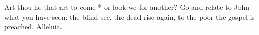 Art thou he that art to come * or look we for another? Go and relate to John what you have seen: the blind see, the dead rise again, to the poor the gospel is preached. Alleluia.